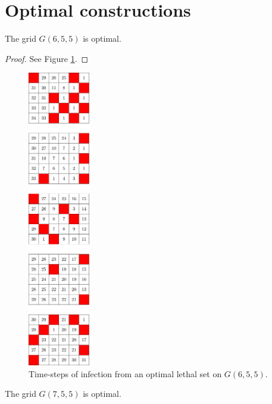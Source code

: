 \newpage

\section{Optimal constructions}

\begin{con}
\label{con:6x5x5}
The grid $G(6,5,5)$ is optimal.
\end{con}

\begin{proof}
See Figure \ref{fig:6x5x5_numbered_heatmap}.
\end{proof}

\begin{figure}[H]
\centering
\includegraphics[width=0.24\textwidth]{figures/A/6x5x5_numbered_heatmap.pdf}
\caption{Time-steps of infection from an optimal lethal set on $G(6,5,5)$.}
\label{fig:6x5x5_numbered_heatmap}
\end{figure}

\newpage

\begin{con}
\label{con:7x5x5}
The grid $G(7,5,5)$ is optimal.
\end{con}

